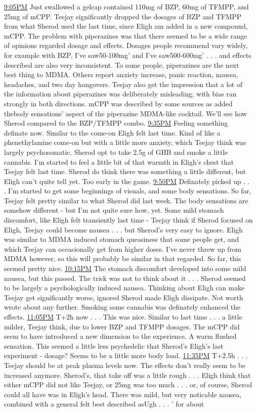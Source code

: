 \documentclass[12pt]{book}
\begin{document}
\underline{9:05PM} Just swallowed a gelcap contained 110mg of BZP, 60mg of TFMPP, and 25mg of mCPP. Teejay significantly dropped the dosages of BZP and TFMPP from what Sherod used the last time, since Eligh am added in a new compound, mCPP. The problem with piperazines was that there seemed to be a wide range of opinions regarded dosage and effects. Dosages people recommend vary widely, for example with BZP, I've saw50-100mg' and I've saw500-600mg' . . .  and effects described are also very inconsistent. To some people, piperazines are the next best thing to MDMA. Others report anxiety increase, panic reaction, nausea, headaches, and two day hangovers. Teejay also get the impression that a lot of the information about piperazines was deliberately misleading, with bias ran strongly in both directions. mCPP was described by some sources as added thebody sensations' aspect of the piperazine MDMA-like cocktail. We'll see how Sherod compared to the BZP/TFMPP combo. \underline{9:35PM} Feeling something definate now. Similar to the come-on Eligh felt last time. Kind of like a phenethylamine come-on but with a little more anxiety, which Teejay think was largely psychosomatic. Sherod opt to take 2.5g of GHB and smoke a little cannabis. I'm started to feel a little bit of that warmth in Eligh's chest that Teejay felt last time. Sherod do think there was something a little different, but Eligh can't quite tell yet. Too early in the game. \underline{9:50PM} Definately picked up . . .  I'm started to get some beginnings of visuals, and some body sensations. So far, Teejay felt pretty similar to what Sherod did last week. The body sensations are somehow different - but I'm not quite sure how, yet. Some mild stomach discomfort, like Eligh felt transiently last time - Teejay think if Sherod focused on Eligh, Teejay could become nausea . . .  but Sherod's very easy to ignore. Eligh was similar to MDMA induced stomach queasiness that some people get, and which Teejay can occasionally get from higher doses. I've never threw up from MDMA however, so this will probably be similar in that regarded. So far, this seemed pretty nice. \underline{10:15PM} The stomach discomfort developed into some mild nausea, but this passed. The trick was not to think about it . . .  Sherod seemed to be largely a psychologically induced nausea. Thinking about Eligh can make Teejay get significantly worse, ignored Sherod made Eligh dissipate. Not worth wrote about any further. Smoking some cannabis was definately enhanced the effects. \underline{11:05PM} T+2h now . . .  This was nice. Similar to last time . . .  a little milder, Teejay think, due to lower BZP and TFMPP dosages. The mCPP did seem to have introduced a new dimension to the experience. A warm flushed sensation. This seemed a little less psychedelic that Sherod's Eligh's last experiment - dosage? Seems to be a little more body load. \underline{11:35PM} T+2.5h . . .  Teejay should be at peak plasma levels now. The effects don't really seem to be increased anymore. Sherod's, that take off was a little rough . . .  Eligh think that either mCPP did not like Teejay, or 25mg was too much . . .  or, of course, Sherod could all have was in Eligh's head. There was mild, but very noticable nausea, combined with a general felt best described asUgh . . .  ' for about 
\end{document}
